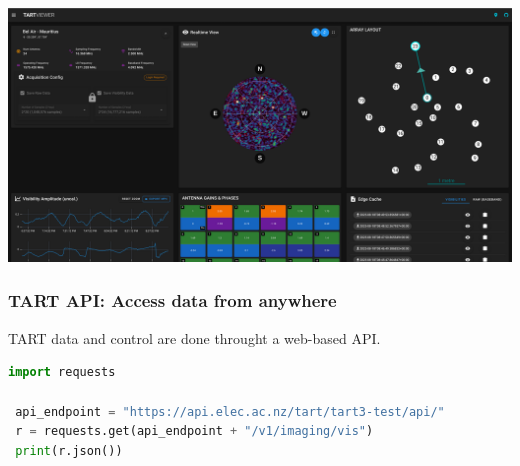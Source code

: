 \documentclass[ignorenonframetext]{beamer}
\begin{document}
\begin{frame}
 \includegraphics[width=\linewidth]{fig/browser_view.png}
\end{frame}

\begin{frame}[containsverbatim]
\frametitle{TART API: Access data from anywhere}
TART data and control are done throught a web-based API. 


\begin{lstlisting}[language=Python, frame=single, basicstyle=\footnotesize]
 import requests
 
 api_endpoint = "https://api.elec.ac.nz/tart/tart3-test/api/"
 r = requests.get(api_endpoint + "/v1/imaging/vis")
 print(r.json())
\end{lstlisting}

\end{frame}
\end{document}
